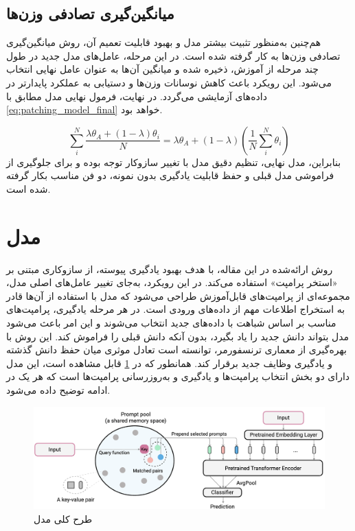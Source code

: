 \subsection{میانگین‌گیری تصادفی وزن‌ها}
هم‌چنین به‌منظور تثبیت بیشتر مدل و بهبود قابلیت تعمیم آن، روش میانگین‌گیری تصادفی وزن‌ها به کار گرفته شده است. در این مرحله، عامل‌های مدل جدید در طول چند مرحله از آموزش، ذخیره شده و میانگین آن‌ها به عنوان عامل نهایی انتخاب می‌شود. این رویکرد باعث کاهش نوسانات وزن‌ها و دستیابی به عملکرد پایدارتر در داده‌های آزمایشی می‌گردد. در نهایت، فرمول نهایی مدل مطابق با \eqref{eq:patching_model_final} خواهد بود.

\begin{equation}\label{eq:patching_model_final}
	\sum_{i}^{N} \frac{\lambda \theta_{A} + (1 - \lambda) \theta_{i}}{N}
	= \lambda \theta_{A} + (1 - \lambda)
	\left( \frac{1}{N} \sum_{i}^{N} \theta_{i} \right)
\end{equation}
بنابراین، مدل نهایی، تنظیم دقیق مدل  با تغییر سازوکار توجه بوده و برای جلوگیری از فراموشی مدل قبلی و حفظ قابلیت یادگیری بدون نمونه، دو فن مناسب بکار گرفته شده است. 
\section{مدل }
روش ارائه‌شده در این مقاله، با هدف بهبود یادگیری پیوسته، از سازوکاری مبتنی بر «استخر پرامپت‌» استفاده می‌کند. در این رویکرد، به‌جای تغییر عامل‌های اصلی مدل، مجموعه‌ای از پرامپت‌های قابل‌آموزش طراحی می‌شود که مدل با استفاده از آن‌ها قادر به استخراج اطلاعات مهم از داده‌های ورودی است. در هر مرحله یادگیری، پرامپت‌های مناسب بر اساس شباهت با داده‌های جدید انتخاب می‌شوند و این امر باعث می‌شود مدل بتواند دانش جدید را یاد بگیرد، بدون آنکه دانش قبلی را فراموش کند. این روش با بهره‌گیری از معماری ترنسفورمر، توانسته است تعادل موثری میان حفظ دانش گذشته و یادگیری وظایف جدید برقرار کند. همانطور که در \cref{fig.32} قابل مشاهده است، این مدل دارای دو بخش انتخاب پرامپت‌ها و یادگیری و به‌روزرسانی پرامپت‌ها است که هر یک در ادامه توضیح داده‌ می‌شود.
‌\begin{figure}
	\centering\includegraphics[scale=.38]{Images/Chapter3/l2p.png}
	\caption[]{ طرح کلی مدل  \cite{l2p}}
	\label{fig.32}
\end{figure}

